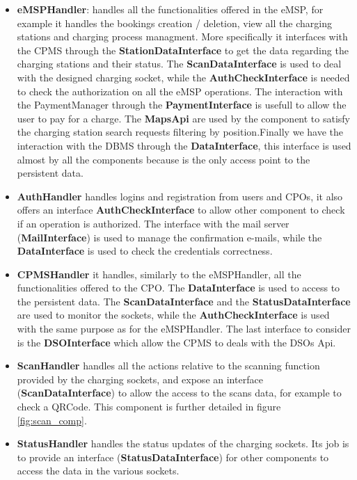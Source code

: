 \begin{itemize}
    \item \textbf{eMSPHandler}: handles all the functionalities offered in the eMSP, for example it handles the bookings creation / deletion, view all the charging stations and charging process managment. More specifically it interfaces with the CPMS through the \textbf{StationDataInterface} to get the data regarding the charging stations and their status. The \textbf{ScanDataInterface} is used to deal with the designed charging socket, while the \textbf{AuthCheckInterface} is needed to check the authorization on all the eMSP operations. The interaction with the PaymentManager through the \textbf{PaymentInterface} is usefull to allow the user to pay for a charge. The \textbf{MapsApi} are used by the component to satisfy the charging station search requests filtering by position.Finally we have the interaction with the DBMS through the \textbf{DataInterface}, this interface is used almost by all the components because is the only access point to the persistent data.
    \item \textbf{AuthHandler} handles logins and registration from users and CPOs, it also offers an interface \textbf{AuthCheckInterface} to allow other component to check if an operation is authorized. The interface with the mail server (\textbf{MailInterface}) is used to manage the confirmation e-mails, while the \textbf{DataInterface} is used to check the credentials correctness.
    \item \textbf{CPMSHandler} it handles, similarly to the eMSPHandler, all the functionalities offered to the CPO. The \textbf{DataInterface} is used to access to the persistent data. The \textbf{ScanDataInterface} and the \textbf{StatusDataInterface} are used to monitor the sockets, while the \textbf{AuthCheckInterface} is used with the same purpose as for the eMSPHandler. The last interface to consider is the \textbf{DSOInterface} which allow the CPMS to deals with the DSOs Api.
    \item \textbf{ScanHandler} handles all the actions relative to the scanning function provided by the charging sockets, and expose an interface (\textbf{ScanDataInterface}) to allow the access to the scans data, for example to check a QRCode. This component is further detailed in figure \ref{fig:scan_comp}.
    \item \textbf{StatusHandler} handles the status updates of the charging sockets. Its job is to provide an interface (\textbf{StatusDataInterface}) for other components to access the data in the various sockets.

\end{itemize}
